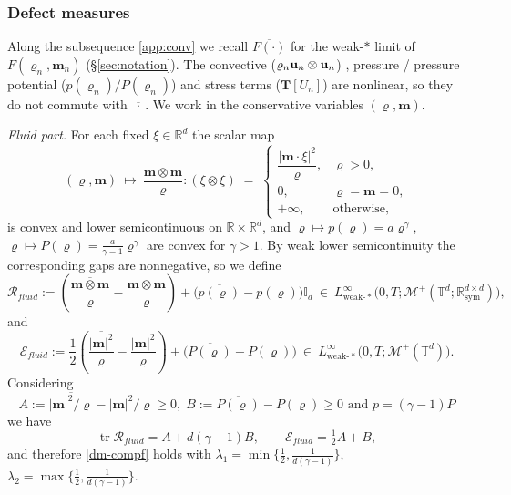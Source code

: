 \documentclass[12pt,a4paper,twoside]{article}
\newcommand{\Ov}[1]{\overline{#1}}
\newcommand{\vr}{\varrho}
\newcommand{\vu}{\vc{u}}
\newcommand{\vc}[1]{{\bf #1}}
\numberwithin{equation}{section}%
\begin{document}
\subsubsection{Defect measures}
\label{sec:stability-defect}
Along the subsequence \eqref{app:conv} we recall $\Ov{F(\cdot)}$ for the weak-$*$ limit of $F(\vr_n,\mathbf m_n)$ (§\ref{sec:notation}). The convective ($\vr_n \vu_n \otimes \vu_n$) , pressure / pressure potential ($p(\vr_n)/P(\vr_n)$) and stress terms ($\mathbf{T}[U_n]$) are nonlinear, so they do not commute with $\Ov{\ \cdot\ }$. We work in the conservative variables $(\vr,\mathbf m)$.

\medskip
\noindent\emph{Fluid part.} For each fixed $\xi\in\mathbb R^d$ the scalar map
\begin{equation}\label{conv1}
	(\vr,\mathbf m)\ \longmapsto\ \frac{\mathbf m\otimes\mathbf m}{\vr}:(\xi\otimes\xi) \;=\;
	\begin{cases}
		\dfrac{|\mathbf m\cdot\xi|^2}{\vr}, & \vr>0,\\[4pt]
		0, & \vr=\mathbf m=0,\\[2pt]
		+\infty, & \text{otherwise},
	\end{cases}
\end{equation}
is convex and lower semicontinuous on $\mathbb R\times\mathbb R^d$, and $\vr\mapsto p(\vr)=a\vr^\gamma$, $\vr\mapsto P(\vr)=\tfrac{a}{\gamma-1}\vr^\gamma$ are convex for $\gamma>1$. By weak lower semicontinuity the corresponding gaps are nonnegative, so we define
\begin{equation}\label{fluid-defect}
	\mathcal R_{fluid} := \left( \Ov{\frac{\mathbf m\otimes\mathbf m}{\vr}} - \frac{\mathbf m\otimes\mathbf m}{\vr} \right) + \Big( \Ov{p(\vr)} - p(\vr) \Big)\mathbb I_d
	\ \in\ L^\infty_{\mathrm{weak}\text{-}*}\big(0,T;\mathcal M^+(\mathbb T^d;\mathbb R^{d\times d}_{\mathrm{sym}})\big),
\end{equation}
and 
\begin{equation}\label{fluid-energy-defect}
	\mathcal E_{fluid} := \frac12\left( \Ov{\frac{|\mathbf m|^2}{\vr}} - \frac{|\mathbf m|^2}{\vr} \right) + \Big( \Ov{P(\vr)} - P(\vr) \Big)
	\ \in\ L^\infty_{\mathrm{weak}\text{-}*}\big(0,T;\mathcal M^+(\mathbb T^d)\big).
\end{equation}
Considering $$A:=\Ov{|\mathbf m|^2/\vr}-|\mathbf m|^2/\vr\ge0, \; B:=\Ov{P(\vr)}-P(\vr)\ge0 \text{ and }p=(\gamma-1)P $$ we have 
\[
\operatorname{tr}\mathcal R_{fluid}=A+d(\gamma-1)B,\qquad \mathcal E_{fluid}=\tfrac12 A+B,
\]
and therefore \eqref{dm-compf} holds with $\lambda_1=\min\{\tfrac12,\tfrac1{d(\gamma-1)}\}$, $\lambda_2=\max\{\tfrac12,\tfrac1{d(\gamma-1)}\}$.
\end{document}
